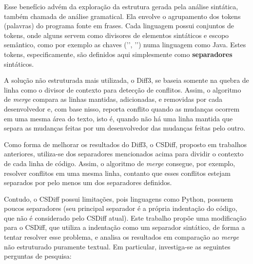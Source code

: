 Esse benefício advém da exploração da estrutura gerada pela análise sintática,
também chamada de análise gramatical. Ela envolve o agrupamento dos tokens (palavras) do programa fonte em frases.
Cada linguagem possui conjuntos de tokens, onde alguns servem como divisores de elementos sintáticos e escopo semântico,
como por exemplo as chaves ('{', '}') numa linguagem como Java. Estes tokens,
especificamente, são definidos aqui simplesmente como \textbf{separadores} sintáticos.

A solução não estruturada mais utilizada, o Diff3, se baseia somente na quebra de linha como o divisor de contexto para
detecção de conflitos. Assim, o algoritmo de \emph{merge} compara as linhas mantidas, adicionadas,
e removidas por cada desenvolvedor
e, com base nisso, reporta conflito quando as mudanças ocorrem em uma mesma área do texto, isto é,
quando não há uma linha mantida que separa as mudanças feitas por um desenvolvedor das mudanças feitas pelo outro.

Como forma de melhorar os resultados do Diff3, o CSDiff, proposto em trabalhos anteriores, utiliza-se dos separadores
mencionados acima para dividir o contexto de cada linha de código. Assim, o algoritmo de \emph{merge} consegue,
por exemplo, resolver
conflitos em uma mesma linha, contanto que esses conflitos estejam separados por pelo menos um dos separadores definidos.

Contudo, o CSDiff possui limitações, pois linguagens como Python, possuem poucos separadores (seu principal separador
é a própria indentação do código, que não é considerado pelo CSDiff atual). Este trabalho propõe uma modificação
para o CSDiff, que utiliza a indentação como um separador sintático, de forma a tentar
resolver esse problema, e analisa os resultados em comparação ao \emph{merge} não estruturado puramente textual.
Em particular, investiga-se as seguintes perguntas de pesquisa:

